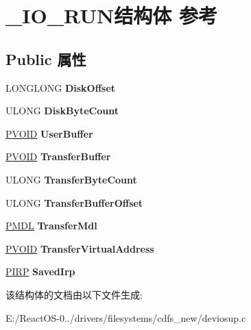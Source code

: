 \hypertarget{struct___i_o___r_u_n}{}\section{\+\_\+\+I\+O\+\_\+\+R\+U\+N结构体 参考}
\label{struct___i_o___r_u_n}
\subsection*{Public 属性}
\begin{DoxyCompactItemize}
\item 
\mbox{\label{struct___i_o___r_u_n_ae13948890e80e46540eaa3ffeb2556ad}} 
L\+O\+N\+G\+L\+O\+NG {\bfseries Disk\+Offset}
\item 
\mbox{\label{struct___i_o___r_u_n_a6c9e29f9b34c7f3fcae7ad79ba1093f2}} 
U\+L\+O\+NG {\bfseries Disk\+Byte\+Count}
\item 
\mbox{\label{struct___i_o___r_u_n_a82a0d1064804203d78de2a58629252db}} 
\hyperlink{interfacevoid}{P\+V\+O\+ID} {\bfseries User\+Buffer}
\item 
\mbox{\label{struct___i_o___r_u_n_aad6765f20d285f61123bab5c1f47a11e}} 
\hyperlink{interfacevoid}{P\+V\+O\+ID} {\bfseries Transfer\+Buffer}
\item 
\mbox{\label{struct___i_o___r_u_n_aa1013b52ce5c0a0f511adbec5c5ff59d}} 
U\+L\+O\+NG {\bfseries Transfer\+Byte\+Count}
\item 
\mbox{\label{struct___i_o___r_u_n_a3d3f30ed4e986428c8f90e8e375867e9}} 
U\+L\+O\+NG {\bfseries Transfer\+Buffer\+Offset}
\item 
\mbox{\label{struct___i_o___r_u_n_a4162221aa9c6cd943fd597d407eb370e}} 
\hyperlink{interfacevoid}{P\+M\+DL} {\bfseries Transfer\+Mdl}
\item 
\mbox{\label{struct___i_o___r_u_n_a4109559244b6bf58e80992137a86cec9}} 
\hyperlink{interfacevoid}{P\+V\+O\+ID} {\bfseries Transfer\+Virtual\+Address}
\item 
\mbox{\label{struct___i_o___r_u_n_a4a1f8ebf51a91d52ab04889116d05463}} 
\hyperlink{interfacevoid}{P\+I\+RP} {\bfseries Saved\+Irp}
\end{DoxyCompactItemize}


该结构体的文档由以下文件生成\+:\begin{DoxyCompactItemize}
\item 
E\+:/\+React\+O\+S-\/0../drivers/filesystems/cdfs\+\_\+new/deviosup.\+c\end{DoxyCompactItemize}
